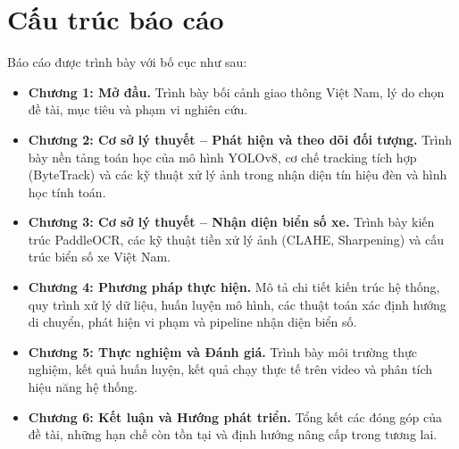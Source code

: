 \section{Cấu trúc báo cáo}
Báo cáo được trình bày với bố cục như sau:
\begin{itemize}
    \item \textbf{Chương 1: Mở đầu.} Trình bày bối cảnh giao thông Việt Nam, lý do chọn đề tài, mục tiêu và phạm vi nghiên cứu.
    
    \item \textbf{Chương 2: Cơ sở lý thuyết -- Phát hiện và theo dõi đối tượng.} Trình bày nền tảng toán học của mô hình YOLOv8, cơ chế tracking tích hợp (ByteTrack) và các kỹ thuật xử lý ảnh trong nhận diện tín hiệu đèn và hình học tính toán.
    
    \item \textbf{Chương 3: Cơ sở lý thuyết -- Nhận diện biển số xe.} Trình bày kiến trúc PaddleOCR, các kỹ thuật tiền xử lý ảnh (CLAHE, Sharpening) và cấu trúc biển số xe Việt Nam.
    
    \item \textbf{Chương 4: Phương pháp thực hiện.} Mô tả chi tiết kiến trúc hệ thống, quy trình xử lý dữ liệu, huấn luyện mô hình, các thuật toán xác định hướng di chuyển, phát hiện vi phạm và pipeline nhận diện biển số.
    
    \item \textbf{Chương 5: Thực nghiệm và Đánh giá.} Trình bày môi trường thực nghiệm, kết quả huấn luyện, kết quả chạy thực tế trên video và phân tích hiệu năng hệ thống.
    
    \item \textbf{Chương 6: Kết luận và Hướng phát triển.} Tổng kết các đóng góp của đề tài, những hạn chế còn tồn tại và định hướng nâng cấp trong tương lai.
\end{itemize}

